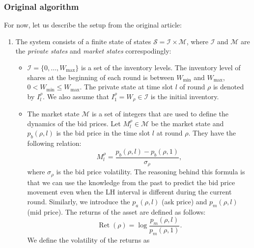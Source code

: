         \subsubsection{Original algorithm}
            For now, let us describe the setup from the original article:
            \begin{enumerate}
                \item The system consists of a finite state of states $\mathcal S = \mathcal I \times \mathcal M$, where $\mathcal I$ and $\mathcal M$ are the \emph{private states} and \emph{market states} correspodingly:
                \begin{itemize}
                    \item $\mathcal I = \{0,\dots, W_{\text{max}}\}$ is a set of the inventory levels. The inventory level of shares at the beginning of each round
                        is between $W_{\text{min}}$ and $W_{\text{max}}$, $0 < W_{\text{min}} \leq W_{\text{max}}$. The private state at time slot $l$ of round $\rho$ 
                        is denoted by $I_l^\rho$. We also assume that $I_1^\rho = W_\rho \in \mathcal I$ is the initial inventory.
                    \item The market state $\mathcal M$ is a set of integers that are used to define the dynamics of the bid prices. Let $M_l^\rho\in \mathcal M$ be 
                        the market state and $p_b(\rho, l)$ is the bid price in the time slot $l$ at round $\rho$. They have the following relation:
                        \begin{equation}
                            M_l^\rho = \frac{p_b(\rho, l) - p_b(\rho, 1)}{\sigma_\rho},
                        \end{equation}
                        where $\sigma_\rho$ is the bid price volatility. 
                        The reasoning behind this formula is that we can use the knowledge from the past to predict the bid price movement even when the LH interval is different during the current round.
                        Similarly, we introduce the $p_a(\rho, l)$ (ask price) and $p_m(\rho, l)$ (mid price).
                        The returns of the asset are defined as follows:
                        \begin{equation*}
                            \operatorname*{Ret} (\rho) = \log \frac{p_m(\rho, l)}{p_m(\rho, 1)} .
                        \end{equation*}
                        We define the volatility of the returns as
                        \begin{equation*}

\end{equation*}
\end{itemize}
\end{enumerate}
